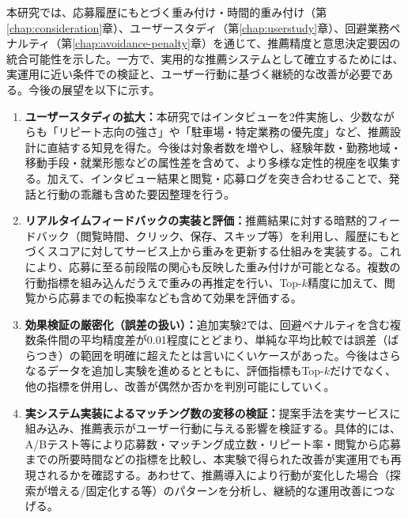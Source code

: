 本研究では、応募履歴にもとづく重み付け・時間的重み付け（第\ref{chap:consideration}章）、ユーザースタディ（第\ref{chap:userstudy}章）、回避業務ペナルティ（第\ref{chap:avoidance-penalty}章）を通じて、推薦精度と意思決定要因の統合可能性を示した。一方で、実用的な推薦システムとして確立するためには、実運用に近い条件での検証と、ユーザー行動に基づく継続的な改善が必要である。今後の展望を以下に示す。

\begin{enumerate}
\item \textbf{ユーザースタディの拡大：}本研究ではインタビューを2件実施し、少数ながらも「リピート志向の強さ」や「駐車場・特定業務の優先度」など、推薦設計に直結する知見を得た。今後は対象者数を増やし、経験年数・勤務地域・移動手段・就業形態などの属性差を含めて、より多様な定性的視座を収集する。加えて、インタビュー結果と閲覧・応募ログを突き合わせることで、発話と行動の乖離も含めた要因整理を行う。
\item \textbf{リアルタイムフィードバックの実装と評価：}推薦結果に対する暗黙的フィードバック（閲覧時間、クリック、保存、スキップ等）を利用し、履歴にもとづくスコアに対してサービス上から重みを更新する仕組みを実装する。これにより、応募に至る前段階の関心も反映した重み付けが可能となる。複数の行動指標を組み込んだうえで重みの再推定を行い、Top-$k$精度に加えて、閲覧から応募までの転換率なども含めて効果を評価する。
\item \textbf{効果検証の厳密化（誤差の扱い）：}追加実験2では、回避ペナルティを含む複数条件間の平均精度差が0.01程度にとどまり、単純な平均比較では誤差（ばらつき）の範囲を明確に超えたとは言いにくいケースがあった。今後はさらなるデータを追加し実験を進めるとともに、評価指標もTop-$k$だけでなく、他の指標を併用し、改善が偶然か否かを判別可能にしていく。
\item \textbf{実システム実装によるマッチング数の変移の検証：}提案手法を実サービスに組み込み、推薦表示がユーザー行動に与える影響を検証する。具体的には、A/Bテスト等により応募数・マッチング成立数・リピート率・閲覧から応募までの所要時間などの指標を比較し、本実験で得られた改善が実運用でも再現されるかを確認する。あわせて、推薦導入により行動が変化した場合（探索が増える/固定化する等）のパターンを分析し、継続的な運用改善につなげる。
\end{enumerate}
